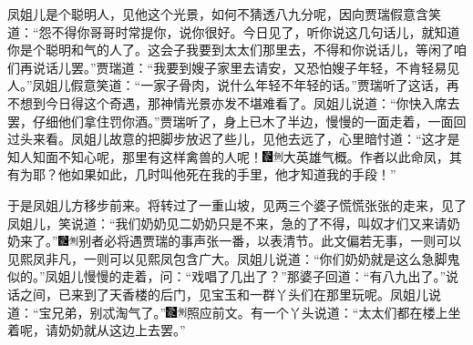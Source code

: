 凤姐儿是个聪明人，见他这个光景，如何不猜透八九分呢，因向贾瑞假意含笑道：``怨不得你哥哥时常提你，说你很好。今日见了，听你说这几句话儿，就知道你是个聪明和气的人了。这会子我要到太太们那里去，不得和你说话儿，等闲了咱们再说话儿罢。''贾瑞道：``我要到嫂子家里去请安，又恐怕嫂子年轻，不肯轻易见人。''凤姐儿假意笑道：``一家子骨肉，说什么年轻不年轻的话。''贾瑞听了这话，再不想到今日得这个奇遇，那神情光景亦发不堪难看了。凤姐儿说道：``你快入席去罢，仔细他们拿住罚你酒。''贾瑞听了，身上已木了半边，慢慢的一面走着，一面回过头来看。凤姐儿故意的把脚步放迟了些儿，见他去远了，心里暗忖道：``这才是知人知面不知心呢，那里有这样禽兽的人呢！{\includegraphics[width=3mm]{../Images/00006}\includegraphics[width=3mm]{../Images/00011}\footnotesize \kaishu 大英雄气概。作者以此命凤，其有为耶？}他如果如此，几时叫他死在我的手里，他才知道我的手段！''

于是凤姐儿方移步前来。将转过了一重山坡，见两三个婆子慌慌张张的走来，见了凤姐儿，笑说道：``我们奶奶见二奶奶只是不来，急的了不得，叫奴才们又来请奶奶来了。''{\includegraphics[width=3mm]{../Images/00006}\includegraphics[width=3mm]{../Images/00011}\footnotesize \kaishu 别者必将遇贾瑞的事声张一番，以表清节。此文偏若无事，一则可以见熙凤非凡，一则可以见熙凤包含广大。}凤姐儿说道：``你们奶奶就是这么急脚鬼似的。''凤姐儿慢慢的走着，问：``戏唱了几出了？''那婆子回道：``有八九出了。''说话之间，已来到了天香楼的后门，见宝玉和一群丫头们在那里玩呢。凤姐儿说道：``宝兄弟，别忒淘气了。''{\includegraphics[width=3mm]{../Images/00006}\includegraphics[width=3mm]{../Images/00011}\footnotesize \kaishu 照应前文。}有一个丫头说道：``太太们都在楼上坐着呢，请奶奶就从这边上去罢。''

